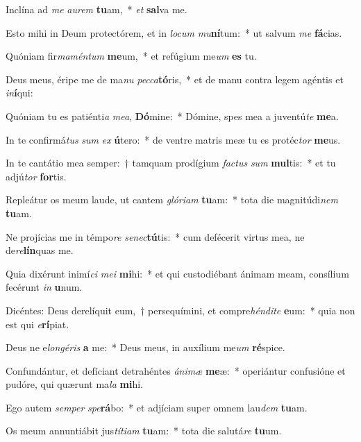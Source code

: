 \item Inclína ad \textit{me} \textit{au}\textit{rem} \textbf{tu}am,~* \textit{et} \textbf{sal}va me.
\item Esto mihi in Deum protectórem, et in \textit{lo}\textit{cum} \textit{mu}\textbf{ní}tum:~* ut salvum \textit{me} \textbf{fá}cias.
\item Quóniam fir\textit{ma}\textit{mén}\textit{tum} \textbf{me}um,~* et refúgium me\textit{um} \textbf{es} tu.
\item Deus meus, éripe me de ma\textit{nu} \textit{pec}\textit{ca}\textbf{tó}ris,~* et de manu contra legem agéntis et \textit{in}\textbf{í}qui:
\item Quóniam tu es patiénti\textit{a} \textit{me}\textit{a}, \textbf{Dó}mine:~* Dómine, spes mea a juventú\textit{te} \textbf{me}a.
\item In te confirmá\textit{tus} \textit{sum} \textit{ex} \textbf{ú}tero:~* de ventre matris meæ tu es protéc\textit{tor} \textbf{me}us.
\item In te cantátio mea semper:~† tamquam prodígium \textit{fac}\textit{tus} \textit{sum} \textbf{mul}tis:~* et tu adjú\textit{tor} \textbf{for}tis.
\item Repleátur os meum laude, ut cantem \textit{gló}\textit{ri}\textit{am} \textbf{tu}am:~* tota die magnitúdi\textit{nem} \textbf{tu}am.
\item Ne projícias me in témpo\textit{re} \textit{se}\textit{nec}\textbf{tú}tis:~* cum defécerit virtus mea, ne de\textit{re}\textbf{lín}quas me.
\item Quia dixérunt inimí\textit{ci} \textit{me}\textit{i} \textbf{mi}hi:~* et qui custodiébant ánimam meam, consílium fecérunt \textit{in} \textbf{u}num.
\item Dicéntes: Deus derelíquit eum,~† persequímini, et compre\textit{hén}\textit{di}\textit{te} \textbf{e}um:~* quia non est qui \textit{e}\textbf{rí}piat.
\item Deus ne e\textit{lon}\textit{gé}\textit{ris} \textbf{a} me:~* Deus meus, in auxílium me\textit{um} \textbf{ré}spice.
\item Confundántur, et defíciant detrahéntes \textit{á}\textit{ni}\textit{mæ} \textbf{me}æ:~* operiántur confusióne et pudóre, qui quærunt ma\textit{la} \textbf{mi}hi.
\item Ego autem \textit{sem}\textit{per} \textit{spe}\textbf{rá}bo:~* et adjíciam super omnem lau\textit{dem} \textbf{tu}am.
\item Os meum annuntiábit jus\textit{tí}\textit{ti}\textit{am} \textbf{tu}am:~* tota die salutá\textit{re} \textbf{tu}um.
